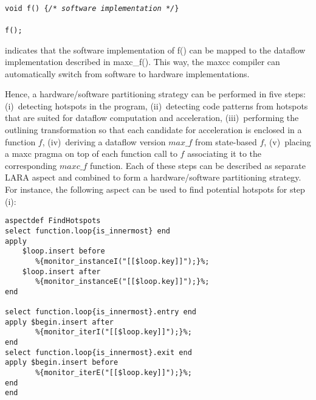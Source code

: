 \noindent\texttt{\footnotesize{} \\
void f() \{\emph{/* software implementation */}\} \\
 \\
f(); \\
}

\noindent indicates that the software implementation of f() can be mapped to the dataflow implementation described in maxc\_f(). This way, the maxcc compiler can automatically switch from software to hardware implementations. 

Hence, a hardware/software partitioning strategy can be performed in five steps: (i)~detecting hotspots in the program, (ii)~detecting code patterns from hotspots that are suited for dataflow computation and acceleration, (iii)~performing the outlining transformation so that each candidate for acceleration is enclosed in a function $f$, (iv)~deriving a dataflow version $max\_f$ from state-based $f$, (v)~placing a maxc pragma on top of each function call to $f$ associating it to the corresponding $maxc\_f$ function. Each of these steps can be described as separate LARA aspect and combined to form a hardware/software partitioning strategy. For instance, the following aspect can be used to find potential hotspots for step (i):

\lstset{style=lara}
\begin{lstlisting}
aspectdef FindHotspots
select function.loop{is_innermost} end
apply 
    $loop.insert before 
       %{monitor_instanceI("[[$loop.key]]");}%;
    $loop.insert after 
       %{monitor_instanceE("[[$loop.key]]");}%;
end

select function.loop{is_innermost}.entry end
apply $begin.insert after 
       %{monitor_iterI("[[$loop.key]]");}%;
end
select function.loop{is_innermost}.exit end
apply $begin.insert before 
       %{monitor_iterE("[[$loop.key]]");}%;
end
end
\end{lstlisting}

